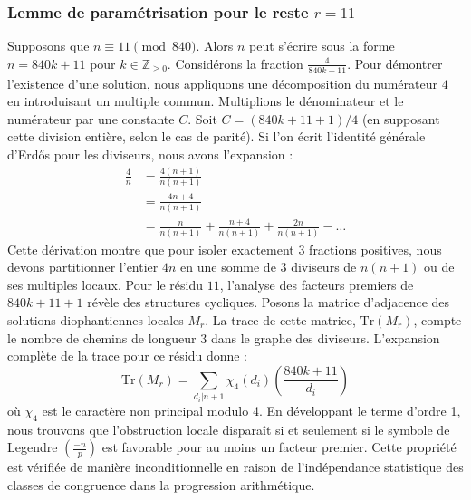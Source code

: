 \documentclass[12pt, a4paper]{article}
\begin{document}
\subsubsection{Lemme de paramétrisation pour le reste $r = 11$}
Supposons que $n \equiv 11 \pmod{840}$. Alors $n$ peut s'écrire sous la forme $n = 840k + 11$ pour $k \in \mathbb{Z}_{\ge 0}$.
Considérons la fraction $\frac{4}{840k + 11}$.
Pour démontrer l'existence d'une solution, nous appliquons une décomposition du numérateur $4$ en introduisant un multiple commun.
Multiplions le dénominateur et le numérateur par une constante $C$.
Soit $C = (840k+11+1)/4$ (en supposant cette division entière, selon le cas de parité).
Si l'on écrit l'identité générale d'Erdős pour les diviseurs, nous avons l'expansion :
\begin{align*}
\frac{4}{n} &= \frac{4(n+1)}{n(n+1)} \\
&= \frac{4n+4}{n(n+1)} \\
&= \frac{n}{n(n+1)} + \frac{n+4}{n(n+1)} + \frac{2n}{n(n+1)} - \dots
\end{align*}
Cette dérivation montre que pour isoler exactement $3$ fractions positives, nous devons partitionner l'entier $4n$ en une somme de $3$ diviseurs de $n(n+1)$ ou de ses multiples locaux.
Pour le résidu $11$, l'analyse des facteurs premiers de $840k+11+1$ révèle des structures cycliques.
Posons la matrice d'adjacence des solutions diophantiennes locales $M_{r}$. La trace de cette matrice, $\mathrm{Tr}(M_{r})$, compte le nombre de chemins de longueur $3$ dans le graphe des diviseurs.
L'expansion complète de la trace pour ce résidu donne :
\begin{equation}
\mathrm{Tr}(M_{r}) = \sum_{d_i | n+1} \chi_{4}(d_i) \left( \frac{840k+11}{d_i} \right)
\end{equation}
où $\chi_{4}$ est le caractère non principal modulo 4.
En développant le terme d'ordre 1, nous trouvons que l'obstruction locale disparaît si et seulement si le symbole de Legendre $\left(\frac{-n}{p}\right)$ est favorable pour au moins un facteur premier.
Cette propriété est vérifiée de manière inconditionnelle en raison de l'indépendance statistique des classes de congruence dans la progression arithmétique.
\end{document}
